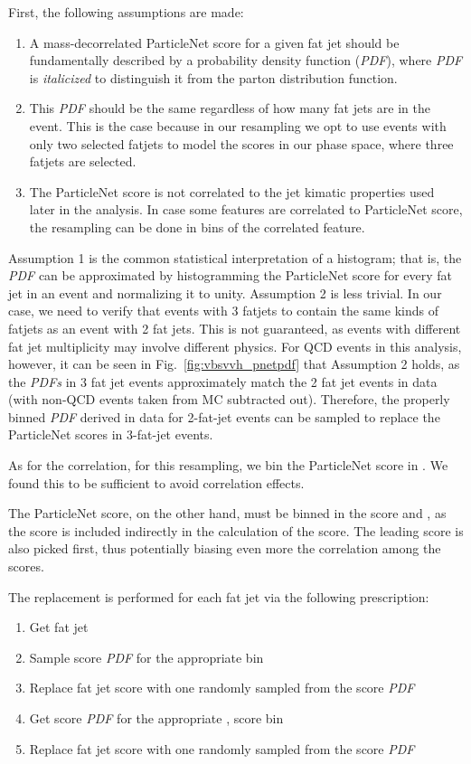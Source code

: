 First, the following assumptions are made:
\begin{enumerate}
    \item A mass-decorrelated ParticleNet score for a given fat jet should be fundamentally described by a probability density function (\textit{PDF}), where \textit{PDF} is \textit{italicized} to distinguish it from the parton distribution function.
    \item This \textit{PDF} should be the same regardless of how many fat jets are in the event. This is the case because in our resampling we opt to use events with only two selected fatjets to model the scores in our phase space, where three fatjets are selected.
    \item The ParticleNet score is not correlated to the jet kimatic properties used later in the analysis. In case some features are correlated to ParticleNet score, the resampling can be done in bins of the correlated feature.
\end{enumerate}

Assumption 1 is the common statistical interpretation of a histogram; that is, the \textit{PDF} can be approximated by histogramming the ParticleNet score for every fat jet in an event and normalizing it to unity. 
Assumption 2 is less trivial. 
In our case, we need to verify that events with 3 fatjets to contain the same kinds of fatjets as an event with 2 fat jets. 
This is not guaranteed, as events with different fat jet multiplicity may involve different physics. 
For QCD events in this analysis, however, it can be seen in Fig.~\ref{fig:vbsvvh_pnetpdf} that Assumption 2 holds, as the \textit{PDFs} in 3 fat jet events approximately match the 2 fat jet events in data (with non-QCD events taken from MC subtracted out).
Therefore, the properly binned \textit{PDF} derived in data for 2-fat-jet events can be sampled to replace the ParticleNet scores in 3-fat-jet events. 

As for the correlation, for this resampling, we bin the ParticleNet \Xtobb score in \pt. 
We found this to be sufficient to avoid correlation effects.

The ParticleNet \XWtoqq score, on the other hand, must be binned in the \Xtobb score and \pt, as the \Xtobb score is included indirectly in the calculation of the \XWtoqq score. 
The leading \Xtobb score is also picked first, thus potentially biasing even more the correlation among the scores.

The replacement is performed for each fat jet via the following prescription:
\begin{enumerate}
    \item Get fat jet \pt
    \item Sample \Xtobb score \textit{PDF} for the appropriate \pt bin
    \item Replace fat jet \Xtobb score with one randomly sampled from the \Xtobb score \textit{PDF}
    \item Get \XWtoqq score \textit{PDF} for the appropriate \pt, \Xtobb score bin
    \item Replace fat jet \XWtoqq score with one randomly sampled from the \XWtoqq score \textit{PDF}
\end{enumerate}

